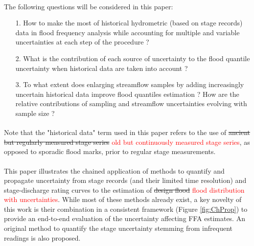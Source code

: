 \documentclass[11pt]{article}
\begin{document}
    \paragraph{}
    The following questions will be considered in this paper: 
    \begin{itemize}
        \item[1.] How to make the most of historical hydrometric (based on stage records) data in flood frequency analysis while accounting for multiple and variable uncertainties at each step of the procedure ? 
        
        \item[2.] What is the contribution of each source of uncertainty to the flood quantile uncertainty when historical data are taken into account ? 
        
        \item[3.] To what extent does enlarging streamflow samples by adding increasingly uncertain historical data improve flood quantiles estimation ? How are the relative contributions of sampling and streamflow uncertainties evolving with sample size ?
    \end{itemize}

    \paragraph{}
    Note that the "historical data" term used in this paper refers to the use of \sout{ancient but regularly measured stage series} \textcolor{red}{old but continuously measured stage series}, as opposed to sporadic flood marks, prior to regular stage measurements. 

    \paragraph{}
    This paper illustrates the chained application of methods to quantify and propagate uncertainty from stage records (and their limited time resolution) and stage-discharge rating curves to the estimation of \sout{design flood} \textcolor{red}{flood distribution with uncertainties}. While most of these methods already exist, a key novelty of this work is their combination in a consistent framework (Figure \ref{fig:ChProp}) to provide an end-to-end evaluation of the  uncertainty affecting FFA estimates. An original method to quantify the stage uncertainty stemming from infrequent readings is also proposed.
\end{document}
